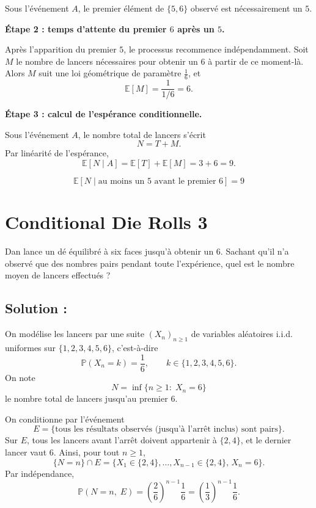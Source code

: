 Sous l’événement $A$, le premier élément de $\{5,6\}$ observé est nécessairement un $5$.

\medskip

\textbf{Étape 2 : temps d’attente du premier $6$ après un $5$.}

Après l’apparition du premier $5$, le processus recommence indépendamment.
Soit $M$ le nombre de lancers nécessaires pour obtenir un $6$ à partir de ce moment-là.
Alors $M$ suit une loi géométrique de paramètre $\frac{1}{6}$, et
\[
\mathbb{E}[M] = \frac{1}{1/6} = 6.
\]

\medskip

\textbf{Étape 3 : calcul de l’espérance conditionnelle.}

Sous l’événement $A$, le nombre total de lancers s’écrit
\[
N = T + M.
\]
Par linéarité de l’espérance,
\[
\mathbb{E}[N \mid A] = \mathbb{E}[T] + \mathbb{E}[M] = 3 + 6 = 9.
\]

\medskip

\[
\boxed{\mathbb{E}[N \mid \text{au moins un } 5 \text{ avant le premier } 6] = 9}
\]

\section{Conditional Die Rolls 3}

\begin{exerciseBox}
Dan lance un dé équilibré à six faces jusqu’à obtenir un $6$.
Sachant qu’il n’a observé que des nombres pairs pendant toute l’expérience,
quel est le nombre moyen  de lancers effectués ?
\end{exerciseBox}

\subsection*{Solution :}

On modélise les lancers par une suite $(X_n)_{n\ge 1}$ de variables aléatoires i.i.d. uniformes sur
$\{1,2,3,4,5,6\}$, c’est-à-dire
\[
\mathbb{P}(X_n=k)=\frac{1}{6},\qquad k\in\{1,2,3,4,5,6\}.
\]
On note
\[
N=\inf\{n\ge 1:\; X_n=6\}
\]
le nombre total de lancers jusqu’au premier $6$.

On conditionne par l’événement
\[
E=\{\text{tous les résultats observés (jusqu’à l’arrêt inclus) sont pairs}\}.
\]
Sur $E$, tous les lancers avant l’arrêt doivent appartenir à $\{2,4\}$, et le dernier lancer vaut $6$.
Ainsi, pour tout $n\ge 1$,
\[
\{N=n\}\cap E=\{X_1\in\{2,4\},\dots,X_{n-1}\in\{2,4\},\,X_n=6\}.
\]
Par indépendance,
\[
\mathbb{P}(N=n,\;E)=\left(\frac{2}{6}\right)^{n-1}\frac{1}{6}
=\left(\frac{1}{3}\right)^{n-1}\frac{1}{6}.
\]

